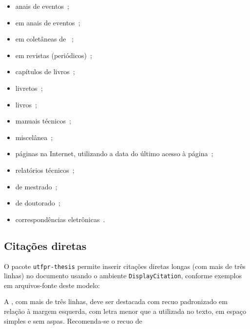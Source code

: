 \begin{itemize}
\item anais de eventos~\cite{Pirmez2002};
\item {} em anais de eventos~\cite{Alt1995,Faina2001};
\item {} em coletâneas de ~\cite{Pinto2000};
\item {} em revistas (periódicos)~\cite{Guimaraes2003};
\item capítulos\label{err:chpt-4} de livros~\cite{Santos2000};
\item livretos~\cite{Einstein1921,Inmetro2021,Thompson2001};
\item livros~\cite{Asimov1950,Camoes1953,Pedrycz1998};
\item manuais técnicos~\cite{ABNT2011NBR14724,ABNT2012NBR6024,ABNT2018NBR6023,ABNT2023NBR10520,IBGE1993,IONA1999,Wilson2020};
\item miscelânea~\cite{Cruz2003,Hadian1982};
\item páginas na Internet, utilizando a data do último acesso à página~\cite[acessadas em 5 de dezembro de 2023]{Gnuplot2023,Larsson2020,Magdowski2012,Smallen2014,Scharrer2018,UTFPR2018};
\item relatórios técnicos~\cite{OMG2000};
\item {} de mestrado~\cite{SantosFilho2003};
\item {} de doutorado~\cite{Faina2000};
\item correspondências eletrônicas~\cite{Sichman2002}.
\end{itemize}

\subsection{Citações diretas}%
\label{ssect:drct-cit}

O pacote \texttt{utfpr-thesis} permite inserir citações diretas longas (com mais de três linhas) no documento usando o ambiente \texttt{DisplayCitation}, conforme exemplos em arquivos-fonte deste modelo:

\begin{DisplayCitation}[brazilian]{\cite[ 7.1.1 \ppno~12 da  10520]{ABNT2023NBR10520}}
A  , com mais de três linhas, deve ser destacada com recuo padronizado em relação à margem esquerda, com letra menor que a utilizada no texto, em espaço simples e sem aspas.
Recomenda-se o recuo de 
\end{DisplayCitation}

